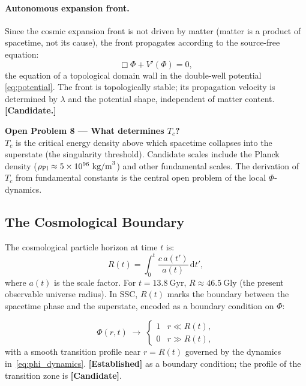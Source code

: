 \documentclass[12pt,a4paper]{article}
\begin{document}
\paragraph{Autonomous expansion front.}
Since the cosmic expansion front is not driven by matter (matter is a
product of spacetime, not its cause), the front propagates according to
the source-free equation:
\begin{equation}
  \Box\Phi + V'(\Phi) = 0,
  \label{eq:autonomous}
\end{equation}
the equation of a topological domain wall in the double-well potential
\eqref{eq:potential}.  The front is topologically stable; its
propagation velocity is determined by $\lambda$ and the potential shape,
independent of matter content.  \textbf{[Candidate.]}

\begin{openbox}
\textbf{Open Problem 8 — What determines $T_c$?}\\
$T_c$ is the critical energy density above which spacetime collapses
into the superstate (the singularity threshold).  Candidate scales
include the Planck density
($\rho_{\rm Pl} \approx 5 \times 10^{96}~\text{kg/m}^3$) and
other fundamental scales.  The derivation of $T_c$ from fundamental
constants is the central open problem of the local $\Phi$-dynamics.
\end{openbox}

\subsection{The Cosmological Boundary}

The cosmological particle horizon at time $t$ is:
\begin{equation}
  R(t) = \int_0^t \frac{c\,a(t')}{a(t)}\,\mathrm{d}t',
\end{equation}
where $a(t)$ is the scale factor. For $t = 13.8~\text{Gyr}$,
$R \approx 46.5~\text{Gly}$ (the present observable universe
radius). In SSC, $R(t)$ marks the boundary between the spacetime
phase and the superstate, encoded as a boundary condition on $\Phi$:

\begin{equation}
  \Phi(r,t) \;\to\; \begin{cases} 1 & r \ll R(t),\\ 0 & r \gg R(t),
  \end{cases}
  \label{eq:boundary}
\end{equation}
with a smooth transition profile near $r = R(t)$ governed by the
dynamics in~\eqref{eq:phi_dynamics}. \textbf{[Established]} as a
boundary condition; the profile of the transition zone is
\textbf{[Candidate]}.
\end{document}
